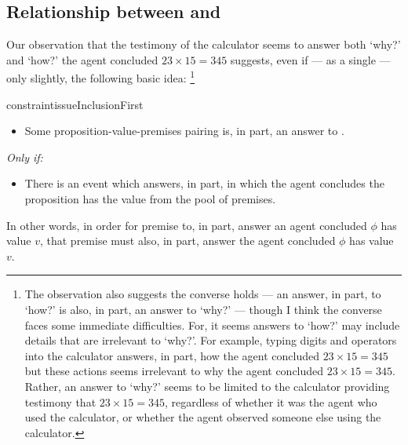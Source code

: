 \subsection{Relationship between \qWhy{} and \qHow{}}

\begin{note}
  Our observation that the testimony of the calculator seems to answer both `why?' and `how?' the agent concluded \(23 \times 15 = 345\) suggests, even if --- as a single  --- only slightly, the following basic idea:%
  \footnote{
    The observation also suggests the converse holds --- an answer, in part, to `how?' is also, in part, an answer to `why?' --- though I think the converse faces some immediate difficulties.
    For, it seems answers to `how?' may include details that are irrelevant to `why?'.
    For example, typing digits and operators into the calculator answers, in part, how the agent concluded \(23 \times 15 = 345\) but these actions seems irrelevant to why the agent concluded \(23 \times 15 = 345\).
    Rather, an answer to `why?' seems to be limited to the calculator providing testimony that \(23 \times 15 = 345\), regardless of whether it was the agent who used the calculator, or whether the agent observed someone else using the calculator.
  }

  \begin{restatable}[\issueInclusion{}]{constraint}{issueInclusionFirst}
    \label{issue:why-inc-in-how}
    \mbox{ }
    \vspace{-\baselineskip}
    \begin{itemize}
    \item
      Some proposition-value-premises pairing is, in part, an answer to \qWhy{}.
    \end{itemize}
    \emph{Only if:}
    \begin{itemize}
    \item
      There is an event which answers, in part, \qHow{} in which the agent concludes the proposition has the value from the pool of premises.
    \end{itemize}
    \vspace{-\baselineskip}
  \end{restatable}

  In other words, in order for premise to, in part, answer \qWhy{} an agent concluded \(\phi\) has value \(v\), that premise must also, in part, answer \qHow{} the agent concluded \(\phi\) has value \(v\).


\end{note}
